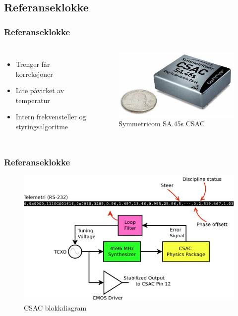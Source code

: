 \documentclass[xcolor=table]{beamer}
\begin{document}
\subsection{Referanseklokke}
\begin{frame}
  \frametitle{Referanseklokke}
  \begin{columns}
    \begin{itemize}
          \setlength\itemsep{2em}
      \item Trenger får korreksjoner
      \item Lite påvirket av temperatur
      \item Intern frekvensteller og styringsalgoritme
    \end{itemize}
      \begin{figure}
        \includegraphics[scale=0.2]{thesis/graphics/csac.jpg}
      \caption{Symmetricom SA.45s CSAC}
    \end{figure}
  \end{columns}
\end{frame}

\begin{frame}
  \frametitle{Referanseklokke}
      \begin{figure}
        \includegraphics[scale=0.35]{thesis/graphics/csac_schematic.pdf}
      \caption{CSAC blokkdiagram}
    \end{figure}
\end{frame}
\end{document}

